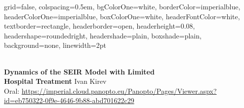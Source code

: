 \documentclass[portrait,final,a0paper]{baposter}
\begin{document}







\newlength{\leftimgwidth}
\begin{poster}%
  {
   grid=false,
  colspacing=0.5em,
  bgColorOne=white,
  borderColor=imperialblue, %
  headerColorOne=imperialblue, %
  boxColorOne=white, %
  headerFontColor=white,
  textborder=rectangle,
  headerborder=open,
  headerheight=0.08\textheight,
  headershape=roundedright,
  headershade=plain,
  boxshade=plain,
  background=none,
  linewidth=2pt
  }

  {\bf \color{imperialblue}
  \hspace{0.1 em}\\
  Dynamics of the SEIR Model with Limited\\ Hospital Treatment}
  {\LARGE \color{imperialgrey}%
	Ivan Kirev\\ \small
    Oral:  \url{https://imperial.cloud.panopto.eu/Panopto/Pages/Viewer.aspx?id=eb750322-0f9e-4646-9b88-abd701622c29}
  }
  {
  }



\end{poster}
\end{document}
